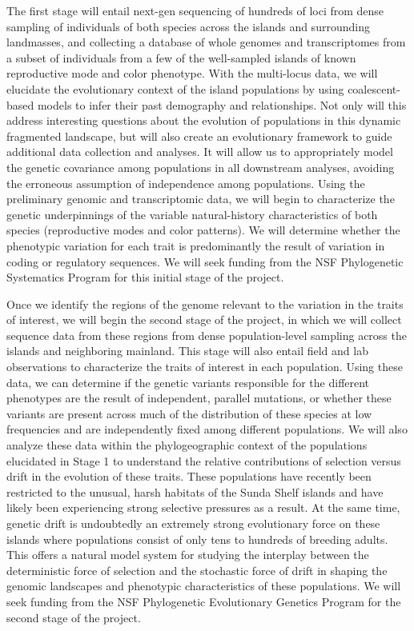 \documentclass[10pt]{article}
\begin{document}
The first stage will entail next-gen sequencing of hundreds of loci from dense sampling of individuals of both species across the islands and surrounding landmasses, and collecting a database of whole genomes and transcriptomes from a subset of individuals from a few of the well-sampled islands of known reproductive mode and color phenotype.
With the multi-locus data, we will elucidate the evolutionary context of the island populations by using coalescent-based models to infer their past demography and relationships.
Not only will this address interesting questions about the evolution of populations in this dynamic fragmented landscape, but will also create an evolutionary framework to guide additional data collection and analyses.
It will allow us to appropriately model the genetic covariance among populations in all downstream analyses, avoiding the erroneous assumption of independence among populations.
Using the preliminary genomic and transcriptomic data, we will begin to characterize the genetic underpinnings of the variable natural-history characteristics of both species (reproductive modes and color patterns).
We will determine whether the phenotypic variation for each trait is predominantly the result of variation in coding or regulatory sequences.
We will seek funding from the NSF Phylogenetic Systematics Program for this initial stage of the project.

Once we identify the regions of the genome relevant to the variation in the traits of interest, we will begin the second stage of the project, in which we will collect sequence data from these regions from dense population-level sampling across the islands and neighboring mainland.
This stage will also entail field and lab observations to characterize the traits of interest in each population.
Using these data, we can determine if the genetic variants responsible for the different phenotypes are the result of independent, parallel mutations, or whether these variants are present across much of the distribution of these species at low frequencies and are independently fixed among different populations.
We will also analyze these data within the phylogeographic context of the populations elucidated in Stage 1 to understand the relative contributions of selection versus drift in the evolution of these traits.
These populations have recently been restricted to the unusual, harsh habitats of the Sunda Shelf islands and have likely been experiencing strong selective pressures as a result.
At the same time, genetic drift is undoubtedly an extremely strong evolutionary force on these islands where populations consist of only tens to hundreds of breeding adults.
This offers a natural model system for studying the interplay between the deterministic force of selection and the stochastic force of drift in shaping the genomic landscapes and phenotypic characteristics of these populations.
We will seek funding from the NSF Phylogenetic Evolutionary Genetics Program for the second stage of the project.
\end{document}
